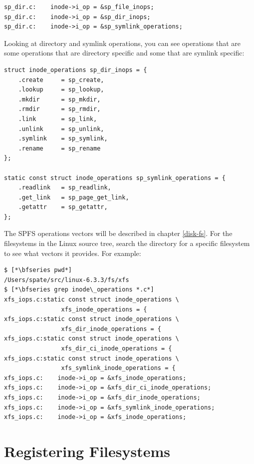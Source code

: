 \begin{lstlisting}
sp_dir.c:    inode->i_op = &sp_file_inops;
sp_dir.c:    inode->i_op = &sp_dir_inops;
sp_dir.c:    inode->i_op = &sp_symlink_operations;
\end{lstlisting}

\noindent
Looking at directory and symlink operations, you can see operations that are some operations that are directory specific and some that are symlink specific:

\begin{lstlisting}
struct inode_operations sp_dir_inops = {
    .create     = sp_create,
    .lookup     = sp_lookup,
    .mkdir      = sp_mkdir,
    .rmdir      = sp_rmdir,
    .link       = sp_link,
    .unlink     = sp_unlink,
    .symlink    = sp_symlink,
    .rename     = sp_rename
};   

static const struct inode_operations sp_symlink_operations = {
    .readlink   = sp_readlink,
    .get_link   = sp_page_get_link,
    .getattr    = sp_getattr, 
};  
\end{lstlisting}

\noindent
The SPFS operations vectors will be described in chapter \ref{disk-fs}. For the filesystems in the Linux source tree, search the directory for a specific filesystem to see what vectors it provides. For example:

\begin{lstlisting}
$ [*\bfseries pwd*]
/Users/spate/src/linux-6.3.3/fs/xfs
$ [*\bfseries grep inode\_operations *.c*]
xfs_iops.c:static const struct inode_operations \
                xfs_inode_operations = {
xfs_iops.c:static const struct inode_operations \
                xfs_dir_inode_operations = {
xfs_iops.c:static const struct inode_operations \
                xfs_dir_ci_inode_operations = {
xfs_iops.c:static const struct inode_operations \
                xfs_symlink_inode_operations = {
xfs_iops.c:    inode->i_op = &xfs_inode_operations;
xfs_iops.c:    inode->i_op = &xfs_dir_ci_inode_operations;
xfs_iops.c:    inode->i_op = &xfs_dir_inode_operations;
xfs_iops.c:    inode->i_op = &xfs_symlink_inode_operations;
xfs_iops.c:    inode->i_op = &xfs_inode_operations;
\end{lstlisting}


\section{Registering Filesystems}\label{register-fs}

